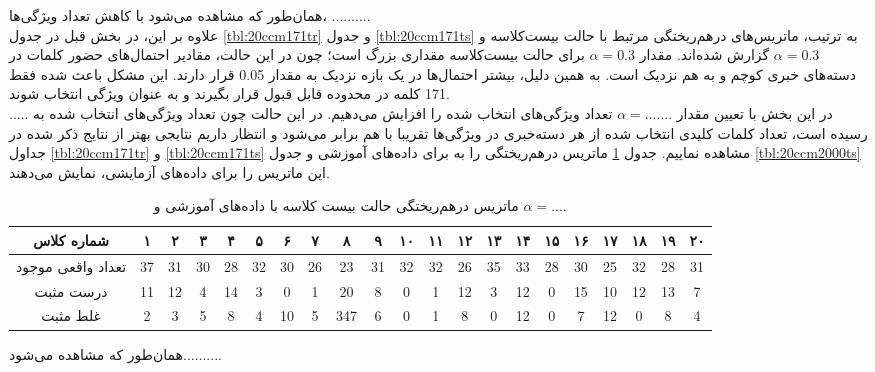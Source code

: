 \documentclass[11.5pt,a4paper]{article}
\begin{document}
همان‌طور که مشاهده می‌شود با کاهش تعداد ویژگی‌ها،‌ ..........
\\

علاوه بر این، در بخش قبل در جدول 
\ref{tbl:20ccm171tr} 
و جدول
\ref{tbl:20ccm171ts}
به ترتیب،‌ ماتریس‌های درهم‌ریختگی مرتبط با حالت بیست‌کلاسه و $\alpha = 0.3$ گزارش شده‌اند. مقدار $\alpha = 0.3 $ برای حالت بیست‌کلاسه مقداری بزرگ است؛ چون در این حالت، مقادیر احتمال‌های حضور کلمات در دسته‌های خبری کوچم و به هم نزدیک است. به همین دلیل،‌ بیشتر احتمال‌ها در یک بازه نزدیک به مقدار 0.05 قرار دارند. این مشکل باعث شده فقط 171 کلمه در محدوده قابل قبول قرار بگیرند و به عنوان ویژگی انتخاب شوند.\\
در این بخش با تعیین مقدار $\alpha = .......$ تعداد ویژگی‌های انتخاب شده را افزایش می‌دهیم. در این حالت چون تعداد ویژگی‌های انتخاب شده به ..... رسیده است،‌ تعداد کلمات کلیدی انتخاب شده از هر دسته‌خبری در ویژگی‌ها تقریبا با هم برابر می‌شود و انتظار داریم نتایجی بهتر از نتایج ذکر 
شده در جداول 
\ref{tbl:20ccm171tr} 
و
\ref{tbl:20ccm171ts}
مشاهده نماییم. جدول 
\ref{tbl:20ccm2000tr}
ماتریس درهم‌ریختگی را به برای داده‌های آموزشی و جدول 
\ref{tbl:20ccm2000ts}
این ماتریس را برای داده‌های آزمایشی، نمایش می‌دهند.
\\

\begin{table}[h]
\center
\caption{ماتریس درهم‌ریختگی حالت بیست کلاسه با داده‌های آموزشی و $\alpha = ....$}
\label{tbl:20ccm2000tr}
\begin{tabular}{c | c | c | c | c | c | c | c | c | c | c | c | c | c | c | c | c | c | c | c | c }
  شماره کلاس & ۱ & ۲ & ۳ & ۴ & ۵ & ۶ & ۷ & ۸ & ۹ & ۱۰ & ۱۱ & ۱۲ & ۱۳ & ۱۴ & ۱۵ & ۱۶ & ۱۷ & ۱۸ & ۱۹ & ۲۰ \\
\hline
\hline
تعداد واقعی موجود& 37  &  31  &  30  &  28  &  32  &  30  &  26  &  23  &  31  &  32  & 32   &  26  &  35  &  33  &  28  &  30  &  25  &  32  &  28  &   31 \\
درست مثبت& 11  &  12  &  4  &  14  &  3  &  0  &  1  &  20  &  8  &  0  &  1  &  12  & 3   &  12  &  0  &  15  &  10  &   12 &  13  &  7  \\
غلط مثبت&  2 &  3  & 5   &  8  &  4  &  10  &  5  &  347  &  6  & 0   &  1  &  8  & 0   &   12 &  0  &  7  &  12  &  0  &  8  &  4  \\

\end{tabular}
\end{table}

همان‌طور که مشاهده می‌شود..........
\end{document}
